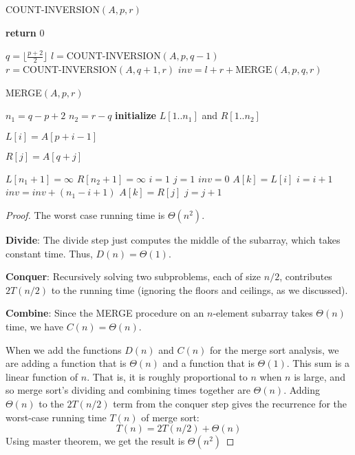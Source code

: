 \documentclass[a4paper]{article}
\begin{document}
\begin{algorithm}
  \caption{COUNT-INVERSION$(A,p,r)$}\label{alg:cap3}
  \begin{algorithmic}[1]
    \State \textbf{return} 0
    \EndIf

    \State $q =\lfloor\frac{p+2}2\rfloor $
    \State $l =\text{COUNT-INVERSION}(A,p, q-1)$
    \State $r = \text{COUNT-INVERSION}(A,q+1,r)$
    \State $inv =l+r+ \text{MERGE}(A,p,q,r)$

  \end{algorithmic}
\end{algorithm}
\begin{algorithm}
  \caption{MERGE$(A,p,r)$}\label{alg:cap4}
  \begin{algorithmic}[1]
    \State $n_1=q-p+2$
    \State $n_2=r-q$
    \State \textbf{initialize} $L[1..n_1]$ and $R[1..n_2]$

    \Statement $L[i]=A[p+i-1]$
    \EndFor

    \Statement $R[j]=A[q+j]$
    \EndFor

    \State $L\left[n_1+1\right]=\infty $
    \State $R\left[n_2+1\right]=\infty $
    \State $i=1 $
    \State $j=1 $
    \State $ inv =0 $
    \State $ A[k]=L[i] $
    \State $i=i+1 $
    \Else
    \State $inv=inv+\left(n_1-i+1\right) $
    \State $A[k]=R[j] $
    \State $j=j+1$
    \EndIf
    \EndFor
  \end{algorithmic}
\end{algorithm}
\begin{proof}
 The worst case running time is $\Theta(n^2)$.

 \textbf{Divide}: The divide step just computes the middle of the subarray, which takes constant time. Thus, $D(n)=\Theta(1)$.

\textbf{Conquer}: Recursively solving two subproblems, each of size $n / 2$, contributes $2 T(n / 2)$ to the running time (ignoring the floors and ceilings, as we discussed).

\textbf{Combine}: Since the MERGE procedure on an $n$-element subarray takes $\Theta(n)$ time, we have $C(n)=\Theta(n)$.

When we add the functions $D(n)$ and $C(n)$ for the merge sort analysis, we are adding a function that is $\Theta(n)$ and a function that is $\Theta(1)$. This sum is a linear function of $n$. That is, it is roughly proportional to $n$ when $n$ is large, and so merge sort's dividing and combining times together are $\Theta(n)$. Adding $\Theta(n)$ to the $2 T(n / 2)$ term from the conquer step gives the recurrence for the worst-case running time $T(n)$ of merge sort:
$$
T(n)=2 T(n / 2)+\Theta(n) 
$$
Using master theorem, we get the result is $\Theta(n^2)$
\end{proof}
\end{document}
